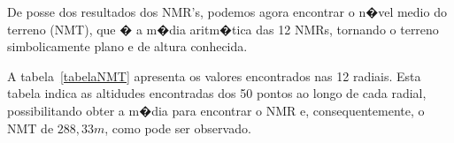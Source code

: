 De posse dos resultados dos NMR's, podemos agora encontrar o n�vel medio do terreno (NMT), que � a m�dia aritm�tica das 12 NMRs,
 tornando o terreno simbolicamente plano e de altura conhecida. 

A tabela~\ref{tabelaNMT} apresenta os valores encontrados nas 12 radiais. Esta tabela indica as altidudes encontradas dos 50 pontos ao longo de cada radial,
 possibilitando obter a m�dia 
para encontrar o NMR e, consequentemente, o NMT de $288,33 m$, como pode ser observado. 

\def\tablename{Tabela}
\begin{table}
\tiny
\vspace*{0.05cm}
\centering

\begin{sideways}

\begin{tabular}{|l|l|l|l|l|l|l|l|l|l|l|l|l|l|} \hline


\end{tabular}
\end{sideways}
\end{table}
